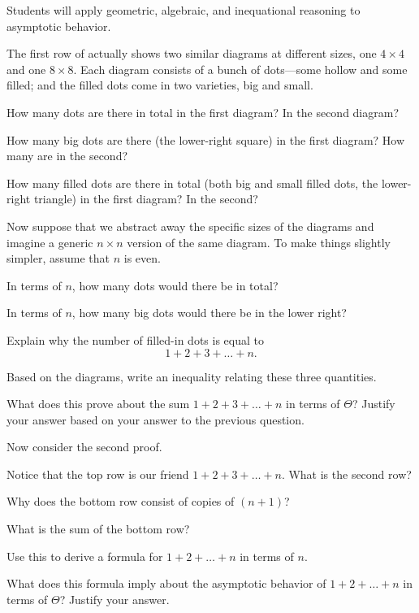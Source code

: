 \documentclass{tufte-handout}
\begin{document}
\begin{objective}
  Students will apply geometric, algebraic, and inequational reasoning
  to asymptotic behavior.
\end{objective}

The first row of  actually shows two similar
diagrams at different sizes, one $4 \times 4$ and one $8 \times 8$.
Each diagram consists of a bunch of dots---some hollow and some filled;
and the filled dots come in two varieties, big and small.
\begin{questions}
  \item How many dots are there in total in the first diagram?  In the
    second diagram?
  \item How many big dots are there (\ie the lower-right square) in the
    first diagram?  How many are in the second?
  \item How many filled dots are there in total (both big and small
    filled dots, \ie the lower-right triangle) in the first diagram?
    In the second?
\end{questions}
Now suppose that we abstract away the specific sizes of the diagrams
and imagine a generic $n \times n$ version of the same diagram.  To
make things slightly simpler, assume that $n$ is even.
\begin{questions}
\item In terms of $n$, how many dots would there be in total?
\item In terms of $n$, how many big dots would there be in the lower right?
\item Explain why the number of filled-in dots is equal to \[ 1 + 2 + 3
  + \dots + n. \]
\item Based on the diagrams, write an inequality relating these three
  quantities.
  \newpage
\item What does this prove about the sum $1 + 2 + 3 + \dots + n$ in
  terms of $\Theta$?  Justify your answer based on your answer to the
  previous question.
\end{questions}
Now consider the second proof.
\begin{questions}
\item Notice that the top row is our friend $1 + 2 + 3 + \dots + n$.
  What is the second row?
\item Why does the bottom row consist of copies of $(n+1)$?
\item What is the sum of the bottom row?
\item Use this to derive a formula for $1 + 2 + \dots + n$ in
  terms of $n$.
\item What does this formula imply about the asymptotic behavior of
  $1 + 2 + \dots + n$ in terms of $\Theta$?  Justify your answer.
\end{questions}
\end{document}

